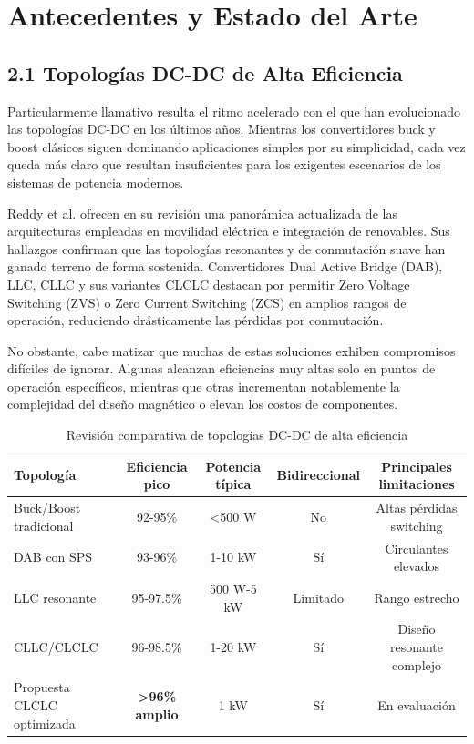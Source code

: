 \section{Antecedentes y Estado del Arte}

\subsection{2.1 Topologías DC-DC de Alta Eficiencia}

Particularmente llamativo resulta el ritmo acelerado con el que han evolucionado las topologías DC-DC en los últimos años. Mientras los convertidores buck y boost clásicos siguen dominando aplicaciones simples por su simplicidad, cada vez queda más claro que resultan insuficientes para los exigentes escenarios de los sistemas de potencia modernos.

Reddy et al. \cite{Reddy2025} ofrecen en su revisión una panorámica actualizada de las arquitecturas empleadas en movilidad eléctrica e integración de renovables. Sus hallazgos confirman que las topologías resonantes y de conmutación suave han ganado terreno de forma sostenida. Convertidores Dual Active Bridge (DAB), LLC, CLLC y sus variantes CLCLC destacan por permitir Zero Voltage Switching (ZVS) o Zero Current Switching (ZCS) en amplios rangos de operación, reduciendo drásticamente las pérdidas por conmutación.

No obstante, cabe matizar que muchas de estas soluciones exhiben compromisos difíciles de ignorar. Algunas alcanzan eficiencias muy altas solo en puntos de operación específicos, mientras que otras incrementan notablemente la complejidad del diseño magnético o elevan los costos de componentes.

\begin{table}[h]
\centering
\caption{Revisión comparativa de topologías DC-DC de alta eficiencia}
\label{tab:topologias}
\begin{tabular}{lcccc}
\hline
Topología & Eficiencia pico & Potencia típica & Bidireccional & Principales limitaciones \\
\hline
Buck/Boost tradicional & 92-95\% & <500 W & No & Altas pérdidas switching \\
DAB con SPS & 93-96\% & 1-10 kW & Sí & Circulantes elevados \\
LLC resonante & 95-97.5\% & 500 W-5 kW & Limitado & Rango estrecho \\
CLLC/CLCLC & 96-98.5\% & 1-20 kW & Sí & Diseño resonante complejo \\
Propuesta CLCLC optimizada & \textbf{>96\% amplio} & 1 kW & Sí & En evaluación \\
\hline
\end{tabular}
\end{table}

